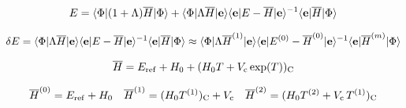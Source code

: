 \documentclass[11pt]{article}
\numberwithin{equation}{section}
\begin{document}
\begin{align*}
  E
=
  \langle\Phi |
  (
    1
  +
    \Lambda 
  )
  \overline{H}
  |\Phi \rangle
+
  \langle\Phi |\Lambda \overline{H}|\mathbf{e}\rangle
  \langle\mathbf{e}|E - \overline{H}|\mathbf{e}\rangle^{-1}
  \langle\mathbf{e}|\overline{H}|\Phi \rangle
\end{align*}

\begin{align*}
  \delta  E
=
  \langle\Phi |\Lambda \overline{H}|\mathbf{e}\rangle
  \langle\mathbf{e}|E - \overline{H}|\mathbf{e}\rangle^{-1}
  \langle\mathbf{e}|\overline{H}|\Phi \rangle
\approx
  \langle\Phi |\Lambda \overline{H}^{(1)}|\mathbf{e}\rangle
  \langle\mathbf{e}|E^{(0)} - \overline{H}^{(0)}|\mathbf{e}\rangle^{-1}
  \langle\mathbf{e}|\overline{H}^{(m)}|\Phi \rangle
\end{align*}


\begin{align}
  \overline{H}
=
  E_{\mathrm{ref}}
+
  H_0
+
  (
    H_0
    T
  +
    V_{\mathrm{c}}\,
    \mathrm{exp}(T)
  )_{\mathrm{C}}
\end{align}

\begin{align}
  \overline{H}^{(0)}
=
  E_{\mathrm{ref}}
+
  H_0
&&
  \overline{H}^{(1)}
=
  (H_0T^{(1)})_{\mathrm{C}}
+
  V_{\mathrm{c}}
&&
  \overline{H}^{(2)}
=
  (
    H_0
    T^{(2)}
  +
    V_{\mathrm{c}}\,
    T^{(1)}
  )_{\mathrm{C}}
\end{align}

\begin{align}
\end{align}
\end{document}
